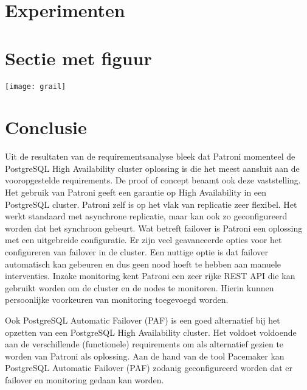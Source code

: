\documentclass[a0,portrait]{a0poster}
\begin{document}
\begin{multicols}{2}
\section*{Experimenten}
\color{black}



\color{HoGentAccent1} 
\section*{Sectie met figuur}
\color{black}


\begin{center}\vspace{1cm}
\texttt{[image: grail]}
\end{center}\vspace{1cm}




\color{HoGentAccent1} 
\section*{Conclusie}
\color{black}

Uit de resultaten van de requirementsanalyse bleek dat Patroni momenteel de PostgreSQL High Availability cluster oplossing is die het meest aansluit aan de vooropgestelde requirements. De proof of concept beaamt ook deze vaststelling. Het gebruik van Patroni geeft een garantie op High Availability in een PostgreSQL cluster. Patroni zelf is op het vlak van replicatie zeer flexibel. Het werkt standaard met asynchrone replicatie, maar kan ook zo geconfigureerd worden dat het synchroon gebeurt. Wat betreft failover is Patroni een oplossing met een uitgebreide configuratie. Er zijn veel geavanceerde opties voor het configureren van failover in de cluster. Een nuttige optie is dat failover automatisch kan gebeuren en dus geen nood hoeft te hebben aan manuele interventies. Inzake monitoring kent Patroni een zeer rijke REST API die kan gebruikt worden om de cluster en de nodes te monitoren. Hierin kunnen persoonlijke voorkeuren van monitoring toegevoegd worden.

Ook PostgreSQL Automatic Failover (PAF) is een goed alternatief bij het opzetten van een PostgreSQL High Availability cluster. Het voldoet voldoende aan de verschillende (functionele) requirements om als alternatief gezien te worden van Patroni als oplossing. Aan de hand van de tool Pacemaker kan PostgreSQL Automatic Failover (PAF) zodanig geconfigureerd worden dat er failover en monitoring gedaan kan worden.



\end{multicols}
\end{document}
